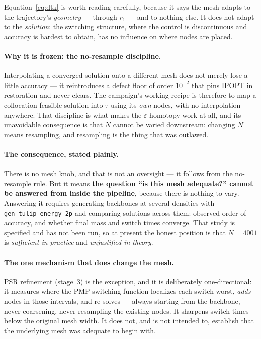 \documentclass[11pt]{article}
\newcommand{\file}[1]{\texttt{#1}}
\begin{document}
Equation~\eqref{eq:dtk} is worth reading carefully, because it says the mesh
adapts to the trajectory's \emph{geometry} --- through $r_1$ --- and to nothing
else. It does not adapt to the \emph{solution}: the switching structure, where
the control is discontinuous and accuracy is hardest to obtain, has no influence
on where nodes are placed.

\paragraph{Why it is frozen: the no-resample discipline.} Interpolating a
converged solution onto a different mesh does not merely lose a little accuracy
--- it reintroduces a defect floor of order $10^{-2}$ that pins IPOPT in
restoration and never clears. The campaign's working recipe is therefore to map
a collocation-feasible solution into $\tau$ using its \emph{own} nodes, with no
interpolation anywhere. That discipline is what makes the $\varepsilon$ homotopy
work at all, and its unavoidable consequence is that $N$ cannot be varied
downstream: changing $N$ means resampling, and resampling is the thing that was
outlawed.

\paragraph{The consequence, stated plainly.} There is no mesh knob, and that is
not an oversight --- it follows from the no-resample rule. But it means
\textbf{the question ``is this mesh adequate?'' cannot be answered from inside
the pipeline}, because there is nothing to vary. Answering it requires
generating backbones at several densities with \file{gen\_tulip\_energy\_2p} and
comparing solutions across them: observed order of accuracy, and whether final
mass and switch times converge. That study is specified and has not been run, so
at present the honest position is that $N=4001$ is \emph{sufficient in practice}
and \emph{unjustified in theory}.

\paragraph{The one mechanism that does change the mesh.} PSR refinement
(stage~3) is the exception, and it is deliberately one-directional: it measures
where the PMP switching function localizes each switch worst, \emph{adds} nodes
in those intervals, and re-solves --- always starting from the backbone, never
coarsening, never resampling the existing nodes. It sharpens switch times below
the original mesh width. It does not, and is not intended to, establish that the
underlying mesh was adequate to begin with.
\end{document}
